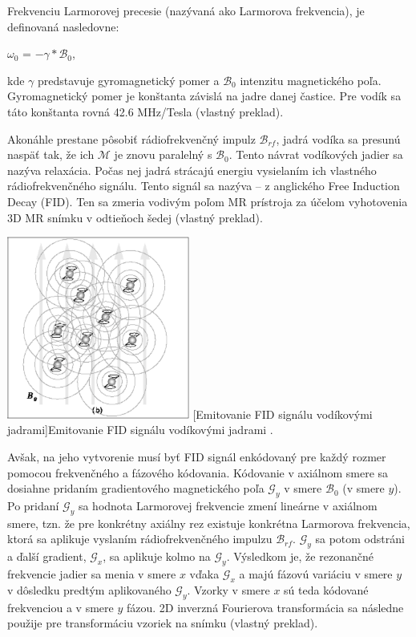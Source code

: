 Frekvenciu Larmorovej precesie (nazývaná ako Larmorova frekvencia), je definovaná nasledovne:

\begin {center}
$\omega_{0}$ = $-\gamma * \mathcal{B}_{0}$,
\end {center}

kde $\gamma$ predstavuje gyromagnetický pomer a $\mathcal{B}_{0}$ intenzitu magnetického poľa.
Gyromagnetický pomer je konštanta závislá na jadre danej častice. Pre vodík sa táto konštanta rovná 42.6 MHz/Tesla \cite{basic_principles_of_mri} (vlastný preklad). \newline

Akonáhle prestane pôsobiť rádiofrekvenčný impulz $\mathcal{B}_{rf}$, jadrá vodíka sa presunú naspäť tak, že ich $\mathcal{M}$ je znovu paralelný s $\mathcal{B}_{0}$. Tento návrat vodíkových jadier sa nazýva relaxácia. Počas nej jadrá strácajú energiu vysielaním ich vlastného rádiofrekvenčného signálu. Tento signál sa nazýva  -- z anglického Free Induction Decay (FID). Ten sa zmeria vodivým poľom MR prístroja za účelom vyhotovenia 3D MR snímku v odtieňoch šedej \cite{basic_principles_of_mri} (vlastný preklad).

\begin {center}
        \centering
        \includegraphics[width=6cm, height=6cm]{media/hydrogen/hydrogen_emitting_rf.png}
        \captionsetup{justification=centering}
        [Emitovanie FID signálu vodíkovými jadrami]{Emitovanie FID signálu vodíkovými jadrami \cite{basic_principles_of_mri}.}
\end {center}

Avšak, na jeho vytvorenie musí byť FID signál enkódovaný pre každý rozmer pomocou frekvenčného a fázového kódovania. Kódovanie v axiálnom smere sa dosiahne pridaním gradientového magnetického poľa $\mathcal{G}_{y}$ v smere $\mathcal{B}_{0}$ (v smere $y$). Po pridaní $\mathcal{G}_{y}$ sa hodnota Larmorovej frekvencie zmení lineárne v axiálnom smere, tzn. že pre konkrétny axiálny rez existuje konkrétna Larmorova frekvencia, ktorá sa aplikuje vyslaním rádiofrekvenčného impulzu $\mathcal{B}_{rf}$. $\mathcal{G}_{y}$ sa potom odstráni a ďalší gradient, $\mathcal{G}_{x}$, sa aplikuje kolmo na $\mathcal{G}_{y}$. Výsledkom je, že rezonančné frekvencie jadier sa menia v smere $x$ vďaka $\mathcal{G}_{x}$ a majú fázovú variáciu v smere $y$ v dôsledku predtým aplikovaného $\mathcal{G}_{y}$. Vzorky v smere $x$ sú teda kódované frekvenciou a v smere $y$ fázou. 2D inverzná Fourierova transformácia sa následne použije pre transformáciu vzoriek na snímku \cite{basic_principles_of_mri} (vlastný preklad). \newline

